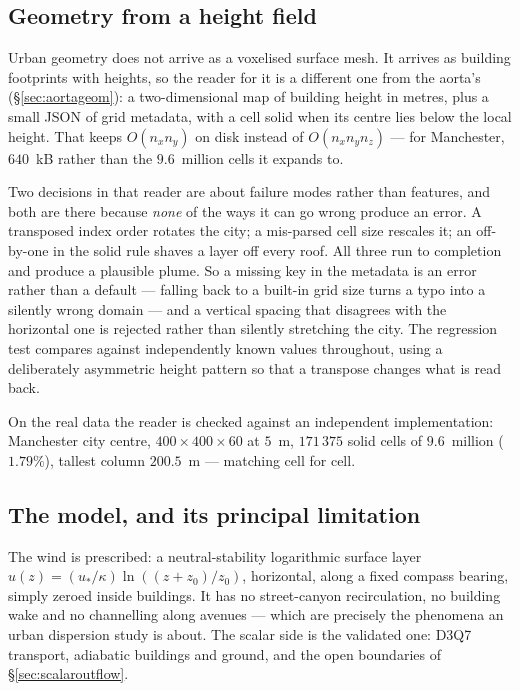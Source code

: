 \documentclass[11pt,a4paper]{article}
\begin{document}
\subsection{Geometry from a height field}
\label{sec:heightfield}

Urban geometry does not arrive as a voxelised surface mesh. It arrives as
building footprints with heights, so the reader for it is a different one from
the aorta's (\S\ref{sec:aortageom}): a two-dimensional map of building height
in metres, plus a small JSON of grid metadata, with a cell solid when its centre
lies below the local height. That keeps $O(n_x n_y)$ on disk instead of
$O(n_x n_y n_z)$ --- for Manchester, $640$~kB rather than the $9.6$~million
cells it expands to.

Two decisions in that reader are about failure modes rather than features, and
both are there because \emph{none} of the ways it can go wrong produce an
error. A transposed index order rotates the city; a mis-parsed cell size
rescales it; an off-by-one in the solid rule shaves a layer off every roof. All
three run to completion and produce a plausible plume. So a missing key in the
metadata is an error rather than a default --- falling back to a built-in grid
size turns a typo into a silently wrong domain --- and a vertical spacing that
disagrees with the horizontal one is rejected rather than silently stretching
the city. The regression test compares against independently known values
throughout, using a deliberately asymmetric height pattern so that a transpose
changes what is read back.

On the real data the reader is checked against an independent implementation:
Manchester city centre, $400\times400\times60$ at $5$~m, $171\,375$ solid cells
of $9.6$~million ($1.79\%$), tallest column $200.5$~m --- matching cell for
cell.

\subsection{The model, and its principal limitation}

The wind is prescribed: a neutral-stability logarithmic surface layer
$u(z) = (u_*/\kappa)\ln((z+z_0)/z_0)$, horizontal, along a fixed compass
bearing, simply zeroed inside buildings. It has no street-canyon recirculation,
no building wake and no channelling along avenues --- which are precisely the
phenomena an urban dispersion study is about. The scalar side is the validated
one: D3Q7 transport, adiabatic buildings and ground, and the open boundaries of
\S\ref{sec:scalaroutflow}.
\end{document}
